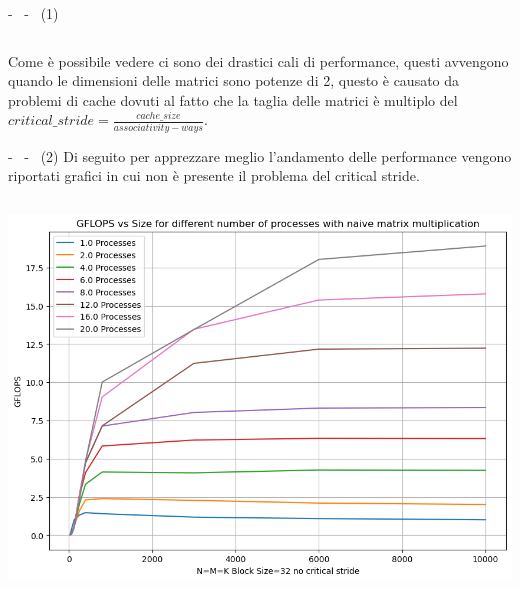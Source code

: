 \documentclass[compress]{beamer}
\begin{document}
\begin{frame}{\secname \text{ }- \subsecname\ \text{ }- \subsubsecname\ (1)}
\begin{columns}
\begin{minipage}{1\textwidth}
\begin{adjustbox}{margin=0cm 0.5cm 0cm 0cm, center}
                \end{adjustbox}
            \end{minipage}
    \end{columns}
    Come è possibile vedere ci sono dei drastici cali di performance, questi avvengono quando le dimensioni delle matrici sono potenze di 2, questo è causato da problemi di cache dovuti al fatto che la taglia delle matrici è multiplo del $critical\_stride=\frac{cache\_size}{associativity-ways}$.
\end{frame}

\begin{frame}{\secname \text{ }- \subsecname\ \text{ }- \subsubsecname\ (2)}
    Di seguito per apprezzare meglio l'andamento delle performance vengono riportati grafici in cui non è presente il problema del critical stride.
    \begin{columns}
            \begin{minipage}{1\textwidth}
                \centering
                \begin{adjustbox}{margin=0cm 0cm 0cm 0.5cm, center} %
                    \includegraphics[width=1\textwidth, frame]{resources/square_naive_nocrit.png}
                \end{adjustbox}
            \end{minipage}
            \begin{minipage}{1\textwidth}
                \centering
                \begin{adjustbox}{margin=0cm 0cm 0cm 0.5cm, center} %

\end{adjustbox}
\end{minipage}
\end{columns}
\end{frame}
\end{document}
